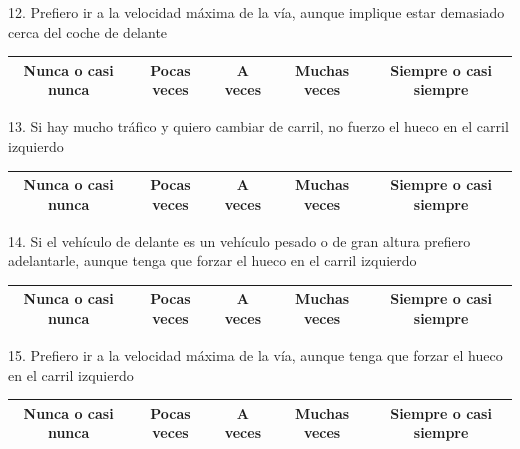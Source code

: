 12. Prefiero ir a la velocidad máxima de la vía, aunque implique estar demasiado cerca del coche de delante
\vspace{-10pt}
\begin{table}[H]
\centering
\begin{tabular}{|c|c|c|c|c|}
\hline
Nunca o casi nunca & Pocas veces & A veces & Muchas veces & Siempre o casi siempre \\ \hline
\end{tabular}
\end{table}

13. Si hay mucho tráfico y quiero cambiar de carril, no fuerzo el hueco en el carril izquierdo
\vspace{-10pt}
\begin{table}[H]
\centering
\begin{tabular}{|c|c|c|c|c|}
\hline
Nunca o casi nunca & Pocas veces & A veces & Muchas veces & Siempre o casi siempre \\ \hline
\end{tabular}
\end{table}

14. Si el vehículo de delante es un vehículo pesado o de gran altura prefiero adelantarle, aunque tenga que forzar el hueco en el carril izquierdo
\vspace{-10pt}
\begin{table}[H]
\centering
\begin{tabular}{|c|c|c|c|c|}
\hline
Nunca o casi nunca & Pocas veces & A veces & Muchas veces & Siempre o casi siempre \\ \hline
\end{tabular}
\end{table}

15. Prefiero ir a la velocidad máxima de la vía, aunque tenga que forzar el hueco en el carril izquierdo 
\vspace{-10pt}
\begin{table}[H]
\centering
\begin{tabular}{|c|c|c|c|c|}
\hline
Nunca o casi nunca & Pocas veces & A veces & Muchas veces & Siempre o casi siempre \\ \hline
\end{tabular}
\end{table}
\newpage

